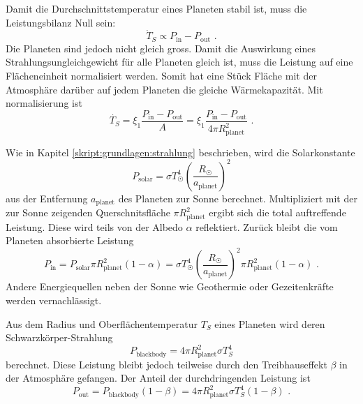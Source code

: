 \begin{refsection}
Damit die Durchschnittstemperatur eines Planeten stabil ist, muss die Leistungsbilanz Null sein:
\begin{equation}
\dot{T}_S \propto P_{\text{in}} - P_{\text{out}}\text{ .}
\end{equation}
Die Planeten sind jedoch nicht gleich gross. Damit die Auswirkung eines Strahlungsungleichgewicht für alle Planeten gleich ist, muss die Leistung auf eine Flächeneinheit normalisiert werden. Somit hat eine Stück Fläche mit der Atmosphäre darüber auf jedem Planeten die gleiche Wärmekapazität. Mit normalisierung ist
\begin{equation}
\dot{T_S} = \xi_1 \frac{P_{\text{in}} - P_{\text{out}}}{A} = \xi_1 \frac{P_{\text{in}} - P_{\text{out}}}{4 \pi R_{\text{planet}}^2}\text{ .}
\end{equation}

Wie in Kapitel \ref{skript:grundlagen:strahlung} beschrieben, wird die Solarkonstante
\begin{equation}
P_{\text{solar}} = \sigma T_{\astrosun}^4 \left( \frac{R_{\astrosun}}{a_{\text{planet}}} \right) ^2
\end{equation}
aus der Entfernung $a_{\text{planet}}$ des Planeten zur Sonne berechnet. Multipliziert mit der zur Sonne zeigenden Querschnitsfläche $\pi R_{\text{planet}}^2$ ergibt sich die total auftreffende Leistung. Diese wird teils von der Albedo $\alpha$ reflektiert. Zurück bleibt die vom Planeten absorbierte Leistung \begin{equation}
P_{\text{in}} = P_{\text{solar}}  \pi R_{\text{planet}}^2 (1-\alpha) = \sigma T_{\astrosun}^4 \left( \frac{R_{\astrosun}}{a_{\text{planet}}} \right) ^2 \pi R_{\text{planet}}^2 (1-\alpha)\text{ .}
\end{equation}
Andere Energiequellen neben der Sonne wie Geothermie oder Gezeitenkräfte werden vernachlässigt.

Aus dem Radius und Oberflächentemperatur $T_{S}$ eines Planeten wird deren Schwarzkörper-Strahlung \begin{equation}
P_{\text{blackbody}} = 4 \pi R_{\text{planet}}^2 \sigma T_{S}^4
\end{equation}
berechnet. Diese Leistung bleibt jedoch teilweise durch den Treibhauseffekt $\beta$ in der Atmosphäre gefangen. Der Anteil der durchdringenden Leistung ist
\begin{equation}
P_{\text{out}} = P_{\text{blackbody}} (1 - \beta) = 4 \pi R_{\text{planet}}^2 \sigma T_{S}^4 (1 - \beta)\text{ .}
\end{equation}


\end{refsection}
